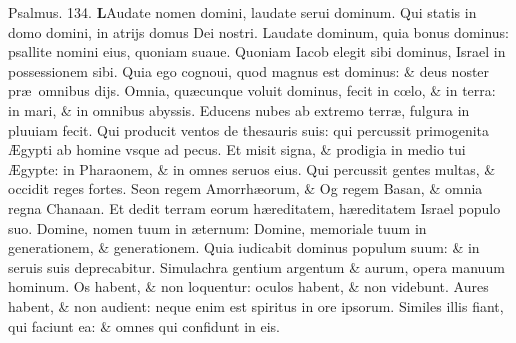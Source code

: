 \documentclass[a5paper,10pt]{book}
\def\ae{æ}
\def\AE{Æ}
\def\oe{œ}
\begin{document}
\begin{multicols*}{2}
\newline \color{red} Psalmus. 134. \color{black}
\vspace{-.5em}
\lettrine[lines=2]{\bfseries \color{red} L}{}Audate nomen domini, laudate serui dominum.
\newline \color{red} Q\color{black}ui statis in domo domini, in atrijs domus Dei nostri.
\newline \color{red} L\color{black}audate dominum, quia bonus dominus: psallite nomini eius, quoniam suaue.
\newline \color{red} Q\color{black}uoniam Iacob elegit sibi dominus, Israel in possessionem sibi.
\newline \color{red} Q\color{black}uia ego cognoui, quod magnus est dominus: \& deus noster pr\ae \ omnibus dijs.
\newline \color{red} O\color{black}mnia, qu\ae cunque voluit dominus, fecit in c\oe lo, \& in terra: in mari, \& in omnibus abyssis.
\newline \color{red} E\color{black}ducens nubes ab extremo terr\ae , fulgura in pluuiam fecit.
\newline \color{red} Q\color{black}ui producit ventos de thesauris suis: qui percussit primogenita \AE gypti ab homine vsque ad pecus.
\newline \color{red} E\color{black}t misit signa, \& prodigia in medio tui \AE gypte: in Pharaonem, \& in omnes seruos eius.
\newline \color{red} Q\color{black}ui percussit gentes multas, \& occidit reges fortes.
\newline \color{red} S\color{black}eon regem Amorrh\ae orum, \& Og regem Basan, \& omnia regna Chanaan.
\newline \color{red} E\color{black}t dedit terram eorum h\ae reditatem, h\ae reditatem Israel populo suo.
\newline \color{red} D\color{black}omine, nomen tuum in \ae ternum: Domine, memoriale tuum in generationem, \& generationem.
\newline \color{red} Q\color{black}uia iudicabit dominus populum suum: \& in seruis suis deprecabitur.
\newline \color{red} S\color{black}imulachra gentium argentum \& aurum, opera manuum hominum.
\newline \color{red} O\color{black}s habent, \& non loquentur: oculos habent, \& non videbunt.
\newline \color{red} A\color{black}ures habent, \& non audient: neque enim est spiritus in ore ipsorum.
\newline \color{red} S\color{black}imiles illis fiant, qui faciunt ea: \& omnes qui confidunt in eis.

\end{multicols*}
\end{document}
